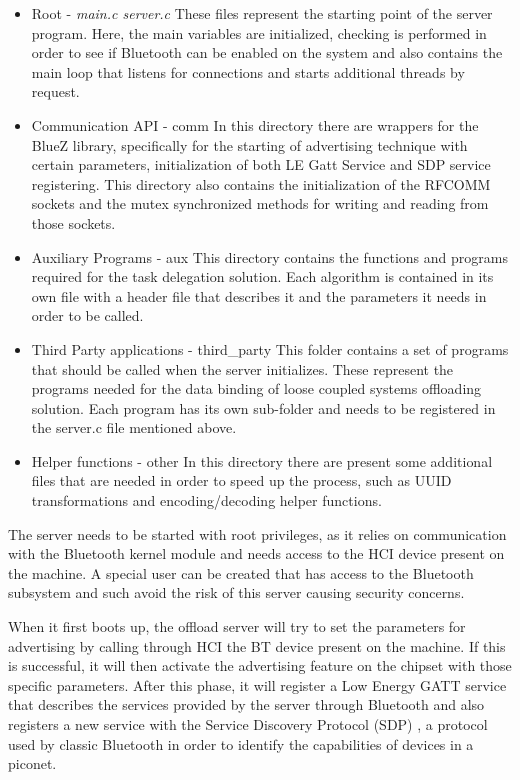 \begin{itemize}

\item{Root - \textit{main.c server.c}}
	These files represent the starting point of the server program. Here, the main variables are initialized, checking is performed in order to see if Bluetooth can be enabled on the system and also contains the main loop that listens for connections and starts additional threads by request.

\item{Communication API - comm}
	In this directory there are wrappers for the BlueZ library, specifically for the starting of advertising technique with certain parameters, initialization of both LE Gatt Service and SDP service registering. This directory also contains the initialization of the RFCOMM sockets and the mutex synchronized methods for writing and reading from those sockets.

\item{Auxiliary Programs - aux}
	This directory contains the functions and programs required for the task delegation solution. Each algorithm is contained in its own file with a header file that describes it and the parameters it needs in order to be called.
	
\item{Third Party applications - third_party}
	This folder contains a set of programs that should be called when the server initializes. These represent the programs needed for the data binding of loose coupled systems offloading solution. Each program has its own sub-folder and needs to be registered in the server.c file mentioned above.
	
\item{Helper functions - other}
	In this directory there are present some additional files that are needed in order to speed up the process, such as UUID transformations and encoding/decoding helper functions.

\end{itemize}


The server needs to be started with root privileges, as it relies on communication with the Bluetooth kernel module and needs access to the HCI device present on the machine. A special user can be created that has access to the Bluetooth subsystem and such avoid the risk of this server causing security concerns.

When it first boots up, the offload server will try to set the parameters for advertising by calling through HCI the BT device present on the machine. If this is successful, it will then activate the advertising feature on the chipset with those specific parameters. After this phase, it will register a Low Energy GATT service that describes the services provided by the server through Bluetooth and also registers a new service with the Service Discovery Protocol (SDP) , a protocol used by classic Bluetooth in order to identify the capabilities of devices in a piconet.


